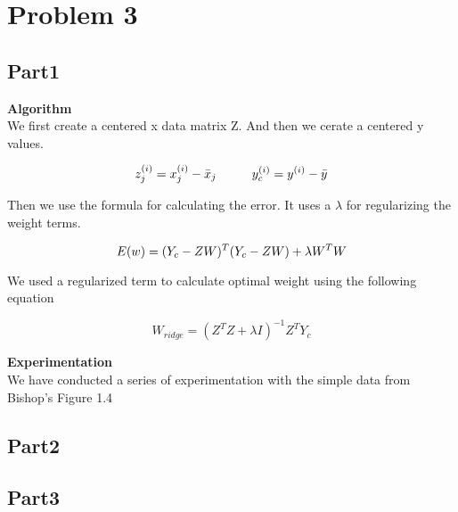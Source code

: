 \section{Problem 3}

\subsection{Part1}

{\bfseries Algorithm} \\
We first create a centered x data matrix Z. And then we cerate a centered y values.

\begin{equation}
z^{(i)}_{j} = x^{(i)}_{j} - \bar{x}_{j} \hspace{10 mm} 
y^{(i)}_{c} = y^{(i)} - \bar{y} \\
\end{equation}

Then we use the formula for calculating the error. It uses a $\lambda$ for regularizing the
weight terms. 

\begin{equation}
  E(w)= (Y_{c} - ZW)^T(Y_{c}-ZW) + \lambda W^TW \\
\end{equation}

We used a regularized term to calculate optimal weight using the following equation

\begin{equation}
  W_{ridge} = (Z^{T}Z + \lambda I)^{-1}Z^{T}Y_{c}
\end{equation}

{\bfseries Experimentation} \\
We have conducted a series of experimentation with the simple data from Bishop's Figure 1.4





\subsection{Part2}






\subsection{Part3}
